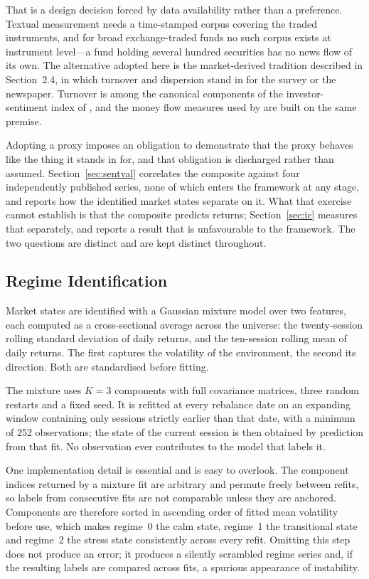 \documentclass{singlecol-new}
\theoremstyle{TH}{
\newtheorem{lemma}{Lemma}
\newtheorem{theorem}[lemma]{Theorem}
\newtheorem{corrolary}[lemma]{Corrolary}
\newtheorem{conjecture}[lemma]{Conjecture}
\newtheorem{proposition}[lemma]{Proposition}
\newtheorem{claim}[lemma]{Claim}
\newtheorem{stheorem}[lemma]{Wrong Theorem}
\newtheorem{algorithm}{Algorithm}
}
\theoremstyle{THrm}{
\newtheorem{definition}{Definition}[section]
\newtheorem{question}{Question}[section]
\newtheorem{remark}{Remark}
\newtheorem{scheme}{Scheme}
}
\theoremstyle{THhit}{
\newtheorem{case}{Case}[section]
}
\begin{document}
That is a design decision forced by data availability rather than a preference. Textual
measurement needs a time-stamped corpus covering the traded instruments, and for broad
exchange-traded funds no such corpus exists at instrument level---a fund holding several
hundred securities has no news flow of its own. The alternative adopted here is the
market-derived tradition described in Section~2.4, in which turnover and dispersion
stand in for the survey or the newspaper. Turnover is among the canonical components of
the investor-sentiment index of \citet{bakerwurgler07}, and the money flow measures used
by \citet{singsiri26} are built on the same premise.

Adopting a proxy imposes an obligation to demonstrate that the proxy behaves like the
thing it stands in for, and that obligation is discharged rather than assumed.
Section~\ref{sec:sentval} correlates the composite against four independently published
series, none of which enters the framework at any stage, and reports how the identified
market states separate on it. What that exercise cannot establish is that the composite
predicts returns; Section~\ref{sec:ic} measures that separately, and reports a result
that is unfavourable to the framework. The two questions are distinct and are kept
distinct throughout.

\subsection{Regime Identification}

Market states are identified with a Gaussian mixture model over two features, each
computed as a cross-sectional average across the universe: the twenty-session rolling
standard deviation of daily returns, and the ten-session rolling mean of daily returns.
The first captures the volatility of the environment, the second its direction. Both
are standardised before fitting.

The mixture uses $K = 3$ components with full covariance matrices, three random
restarts and a fixed seed. It is refitted at every rebalance date on an expanding
window containing only sessions strictly earlier than that date, with a minimum of 252
observations; the state of the current session is then obtained by prediction from that
fit. No observation ever contributes to the model that labels it.

One implementation detail is essential and is easy to overlook. The component indices
returned by a mixture fit are arbitrary and permute freely between refits, so labels
from consecutive fits are not comparable unless they are anchored. Components are
therefore sorted in ascending order of fitted mean volatility before use, which makes
regime~0 the calm state, regime~1 the transitional state and regime~2 the stress state
consistently across every refit. Omitting this step does not produce an error; it
produces a silently scrambled regime series and, if the resulting labels are compared
across fits, a spurious appearance of instability.
\end{document}
